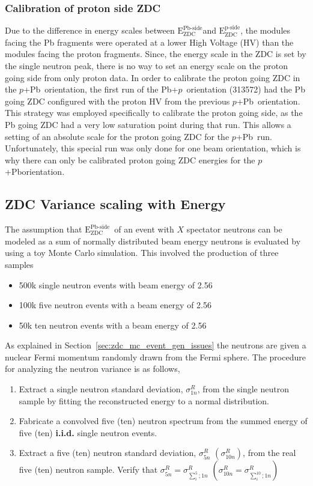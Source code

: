 \documentclass[NOTE, atlasdraft=true, texlive=2020, UKenglish]{atlasdoc}
\newcommand{\EZDC}{$\text{E}_\text{ZDC}^\text{Pb-side}$}
\newcommand{\EZDCp}{$\text{E}_\text{ZDC}^\text{p-side}$}
\newcommand{\pxPb}{$p$+Pb}
\newcommand{\Pbxp}{Pb+$p$}
\begin{document}
\subsubsection{Calibration of proton side ZDC}
Due to the difference in energy scales between \EZDC and \EZDCp, the modules facing the Pb fragments were operated at a lower High Voltage (HV) than the modules facing the proton fragments.  Since, the energy scale in the ZDC is set by the single neutron peak, there is no way to set an energy scale on the proton going side from only proton data.  In order to calibrate the proton going ZDC in the \pxPb\ orientation, the first run of the \Pbxp\ orientation (313572) had the Pb going ZDC configured with the proton HV from the previous \pxPb\ orientation.  This strategy was employed specifically to calibrate the proton going side, as the Pb going ZDC had a very low saturation point during that run. This allows a setting of an absolute scale for the proton going ZDC for the \pxPb\ run. Unfortunately, this special run was only done for one beam orientation, which is why there can only be calibrated proton going ZDC energies for the \pxPb orientation.  


\subsection{ZDC Variance scaling with Energy}
\label{sec:zdc_mc_reso_studies}
The assumption that \EZDC\ of an event with $X$ spectator neutrons can be modeled as a sum of normally distributed beam energy neutrons is evaluated by using a toy Monte Carlo simulation.  This involved the production of three samples
\begin{itemize}
    \item 500k single neutron events with beam energy of 2.56 \TeV\
    \item 100k five neutron events with a beam energy of 2.56 \TeV\
    \item 50k ten neutron events with a beam energy of 2.56 \TeV\
\end{itemize}
As explained in Section~\ref{sec:zdc_mc_event_gen_issues} the neutrons are given a nuclear Fermi momentum \cite{Moniz:1971mt} randomly drawn from the Fermi sphere.  The procedure for analyzing the neutron variance is as follows,
\begin{enumerate}
    \item Extract a single neutron standard deviation, $\sigma_{1n}^{R}$, from the single neutron sample by fitting the reconstructed energy to a normal distribution.
    \item Fabricate a convolved five (ten) neutron spectrum from the summed energy of five (ten) \textbf{i.i.d.} single neutron events.  
\item Extract a five (ten) neutron standard deviation, $\sigma_{5n}^{R}$  $\left(\sigma_{10n}^{R}\right)$, from the real five (ten) neutron sample.  Verify that $\sigma_{5n}^{R} = \sigma_{\sum_i^5;1n}^{R}$ $\left(\sigma_{10n}^{R} = \sigma_{\sum_i^{10};1n}^{R}\right)$ 
\end{enumerate}
\end{document}
